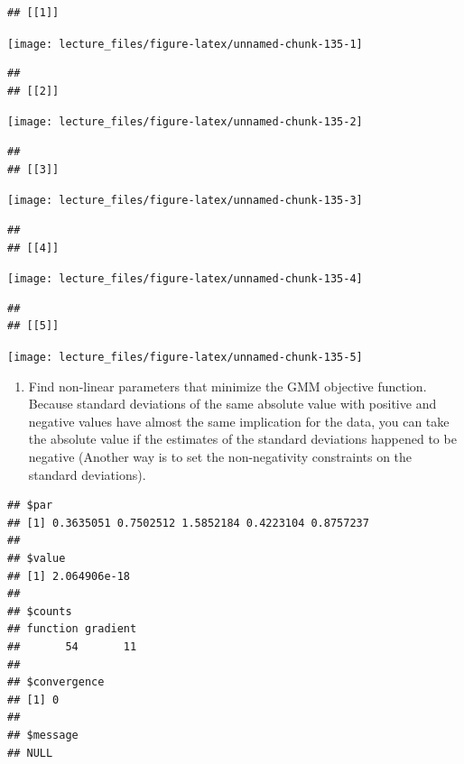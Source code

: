 \documentclass[
]{book}
\providecommand{\tightlist}{%
  \setlength{\itemsep}{0pt}\setlength{\parskip}{0pt}}
\begin{document}
\begin{verbatim}
## [[1]]
\end{verbatim}

\begin{center}\texttt{[image: lecture\_files/figure-latex/unnamed-chunk-135-1]} \end{center}

\begin{verbatim}
## 
## [[2]]
\end{verbatim}

\begin{center}\texttt{[image: lecture\_files/figure-latex/unnamed-chunk-135-2]} \end{center}

\begin{verbatim}
## 
## [[3]]
\end{verbatim}

\begin{center}\texttt{[image: lecture\_files/figure-latex/unnamed-chunk-135-3]} \end{center}

\begin{verbatim}
## 
## [[4]]
\end{verbatim}

\begin{center}\texttt{[image: lecture\_files/figure-latex/unnamed-chunk-135-4]} \end{center}

\begin{verbatim}
## 
## [[5]]
\end{verbatim}

\begin{center}\texttt{[image: lecture\_files/figure-latex/unnamed-chunk-135-5]} \end{center}

\begin{enumerate}
\def\labelenumi{\arabic{enumi}.}
\setcounter{enumi}{12}
\tightlist
\item
  Find non-linear parameters that minimize the GMM objective function. Because standard deviations of the same absolute value with positive and negative values have almost the same implication for the data, you can take the absolute value if the estimates of the standard deviations happened to be negative (Another way is to set the non-negativity constraints on the standard deviations).
\end{enumerate}

\begin{verbatim}
## $par
## [1] 0.3635051 0.7502512 1.5852184 0.4223104 0.8757237
## 
## $value
## [1] 2.064906e-18
## 
## $counts
## function gradient 
##       54       11 
## 
## $convergence
## [1] 0
## 
## $message
## NULL
\end{verbatim}
\end{document}
